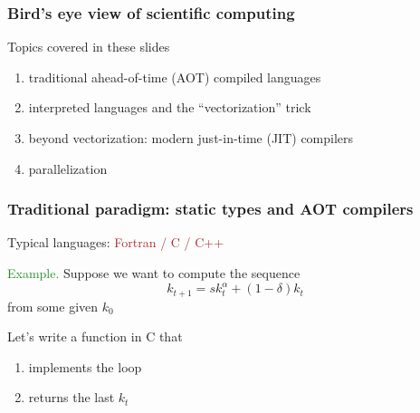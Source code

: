 \documentclass[
    xcolor={svgnames,dvipsnames},
    hyperref={colorlinks, citecolor=DeepPink4, linkcolor=DarkRed, urlcolor=DarkBlue}
    ]{beamer}  %
\newcommand{\Eg}{\textcolor{ForestGreen}{Example. }}
\newcommand{\brown}[1]{\textcolor{Brown}{\sf #1}}
\newcommand{\1}{\mathbbm 1}
\begin{document}
\begin{frame}
    \frametitle{Bird's eye view of scientific computing}

    \vspace{0.5em}
    \vspace{0.5em}
    Topics covered in these slides
    \vspace{0.5em}

    \begin{enumerate}
        \item traditional ahead-of-time (AOT) compiled languages
        \vspace{0.5em}
        \item interpreted languages and the ``vectorization'' trick
        \vspace{0.5em}
        \item beyond vectorization: modern just-in-time (JIT) compilers
        \vspace{0.5em}
        \item parallelization
    \end{enumerate}

\end{frame}





\begin{frame}
    \frametitle{Traditional paradigm: static types and AOT compilers}

    Typical languages: \brown{Fortran / C / C++ }

        \vspace{0.5em}
        \vspace{0.5em}
    \Eg Suppose we want to compute the sequence
    \begin{equation*}
        k_{t+1} = s k_t^\alpha + (1 - \delta) k_t
    \end{equation*}
    from some given $k_0$ 

        \vspace{0.5em}
        \vspace{0.5em}

    Let's write a function in C that 
    \begin{enumerate}
        \item implements the loop 
        \vspace{0.5em}
        \item returns the last $k_t$
    \end{enumerate}


\end{frame}
\end{document}
